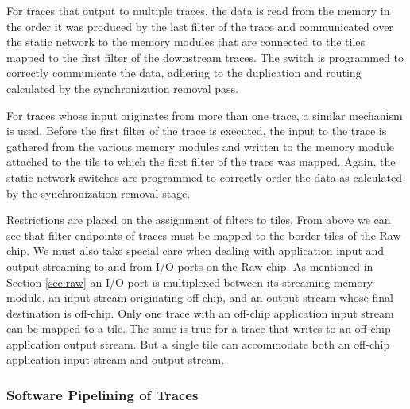 For traces that output to multiple traces, the data is read from the
memory in the order it was produced by the last filter of the trace
and communicated over the static network to the memory modules that
are connected to the tiles mapped to the first filter of the
downstream traces. The switch is programmed to correctly communicate
the data, adhering to the duplication and routing calculated by the
synchronization removal pass.

For traces whose input originates from more than one trace, a similar
mechanism is used.  Before the first filter of the trace is executed,
the input to the trace is gathered from the various memory modules
and written to the memory module attached to the tile to which the
first filter of the trace was mapped.  Again, the static network
switches are programmed to correctly order the data as calculated by
the synchronization removal stage.   

Restrictions are placed on the assignment of filters to tiles. From
above we can see that filter endpoints of traces must be mapped to the
border tiles of the Raw chip. We must also take special care when
dealing with application input and output streaming to and from I/O
ports on the Raw chip.  As mentioned in Section \ref{sec:raw} an I/O
port is multiplexed between its streaming memory module, an input
stream originating off-chip, and an output stream whose final
destination is off-chip.  Only one trace with an off-chip application
input stream can be mapped to a tile.  The same is true for a trace
that writes to an off-chip application output stream.  But a single
tile can accommodate both an off-chip application input stream and
output stream.

\subsubsection{Software Pipelining of Traces}
